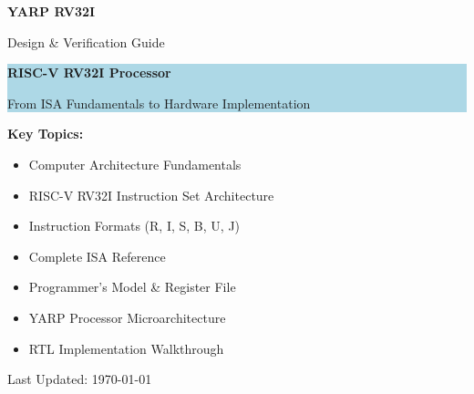 \documentclass[12pt, a4paper, oneside]{book}
\begin{document}
\begin{titlepage}
  \centering
  \vspace*{2cm}

  {\color{darkblue}\Huge\bfseries YARP RV32I}

  \vspace{0.5cm}

  {\color{accentblue}\LARGE Design \& Verification Guide}

  \vspace{2cm}

  \begin{center}
    \colorbox{lightblue}{
      \parbox{0.8\textwidth}{
        \centering
        \vspace{1cm}
        {\color{darkblue}\Large\bfseries RISC-V RV32I Processor}

        \vspace{0.5cm}

        {\color{accentblue}\normalsize From ISA Fundamentals to Hardware Implementation}
        \vspace{1cm}
      }
    }
  \end{center}

  \vspace{3cm}

  {\color{gold}\large\bfseries Key Topics:}
  \begin{itemize}
    \item[\color{purple}\checkmark] Computer Architecture Fundamentals
    \item[\color{purple}\checkmark] RISC-V RV32I Instruction Set Architecture
    \item[\color{purple}\checkmark] Instruction Formats (R, I, S, B, U, J)
    \item[\color{purple}\checkmark] Complete ISA Reference
    \item[\color{purple}\checkmark] Programmer's Model \& Register File
    \item[\color{purple}\checkmark] YARP Processor Microarchitecture
    \item[\color{purple}\checkmark] RTL Implementation Walkthrough
  \end{itemize}

  \vfill

  {\color{darkgreen}\normalsize Last Updated: \today}

\end{titlepage}
\end{document}

